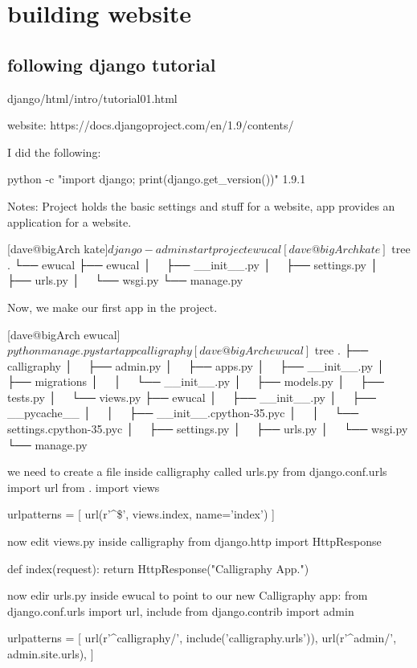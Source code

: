 \chapter{building website}

\section{following django tutorial} %

django/html/intro/tutorial01.html

website: https://docs.djangoproject.com/en/1.9/contents/

I did the following:


python -c "import django; print(django.get_version())"
1.9.1

Notes:  Project holds the basic settings and stuff for a website,  app provides an application for a website.


[dave@bigArch kate]$ django-admin startproject ewucal
[dave@bigArch kate]$ tree
.
└── ewucal
    ├── ewucal
    │   ├── __init__.py
    │   ├── settings.py
    │   ├── urls.py
    │   └── wsgi.py
    └── manage.py

    Now, we make our first app in the project.
    
[dave@bigArch ewucal]$ python manage.py startapp calligraphy
[dave@bigArch ewucal]$ tree
.
├── calligraphy
│   ├── admin.py
│   ├── apps.py
│   ├── __init__.py
│   ├── migrations
│   │   └── __init__.py
│   ├── models.py
│   ├── tests.py
│   └── views.py
├── ewucal
│   ├── __init__.py
│   ├── __pycache__
│   │   ├── __init__.cpython-35.pyc
│   │   └── settings.cpython-35.pyc
│   ├── settings.py
│   ├── urls.py
│   └── wsgi.py
└── manage.py

we need to create a file inside calligraphy called urls.py
from django.conf.urls import url
from . import views

urlpatterns = [
    url(r'^\$', views.index, name='index')
]


now edit views.py inside calligraphy
from django.http import HttpResponse

def index(request):
    return HttpResponse("Calligraphy App.")
   
now edir urls.py inside ewucal to point to our new Calligraphy app:
from django.conf.urls import url, include
from django.contrib import admin

urlpatterns = [
    url(r'^calligraphy/', include('calligraphy.urls')),
    url(r'^admin/', admin.site.urls),
]


